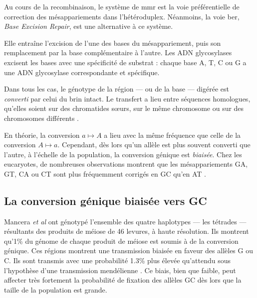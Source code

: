 \documentclass[11pt, oneside]{scrartcl}
\begin{document}
Au cours de la recombinaison, le système de \ac{mmr} est la voie préférentielle
de correction des mésappariements dans l'hétéroduplex. Néanmoins, la voie
\ac{ber}, \emph{Base Excision Repair}, est une alternative à ce système.

Elle entraîne l'excision de l'une des bases du mésappariement, puis son
remplacement par la base complémentaire à l'autre. Les ADN glycosylases excisent
les bases avec une spécificité de substrat : chaque base A, T, C ou G a une ADN
glycosylase correspondante et spécifique.

Dans tous les cas, le génotype de la région --- ou de la base --- digérée est
\emph{converti} par celui du brin intact. Le transfert a lieu entre séquences
homologues, qu'elles soient sur des chromatides sœurs, sur le même chromosome ou
sur des chromosomes différents \cite{chen_gene_2007}.

\begin{transition}
En théorie, la conversion $a \mapsto A$ a lieu avec la même fréquence que celle
de la conversion $A \mapsto a$. Cependant, dès lors qu'un allèle est plus
souvent converti que l'autre, à l'échelle de la population, la conversion
génique est {\em biaisée}. Chez les eucaryotes, de nombreuses observations montrent
que les mésappariements GA, GT, CA ou CT sont plus fréquemment corrigés
en GC qu'en AT \cite{duret_biased_2009}. 
\end{transition}

\subsection{La conversion génique biaisée vers GC}
\label{sec:orgheadline7}

Mancera \emph{et al} \cite{mancera_high-resolution_2008} ont génotypé l'ensemble des
quatre haplotypes --- les tétrades --- résultants des produits de méiose de 46
levures, à haute résolution. Ils montrent qu'1\% du génome de chaque produit de
méiose est soumis à de la conversion génique. Ces régions montrent une
transmission biaisée en faveur des allèles G ou C. Ils sont transmis avec une
probabilité 1.3\% plus élevée qu'attendu sous l'hypothèse d'une transmission
mendélienne \cite{mancera_high-resolution_2008}. Ce biais, bien que faible, peut
affecter très fortement la probabilité de fixation des allèles GC dès lors que
la taille de la population est grande\cite{nagylaki_evolution_1983}. 
\end{document}
